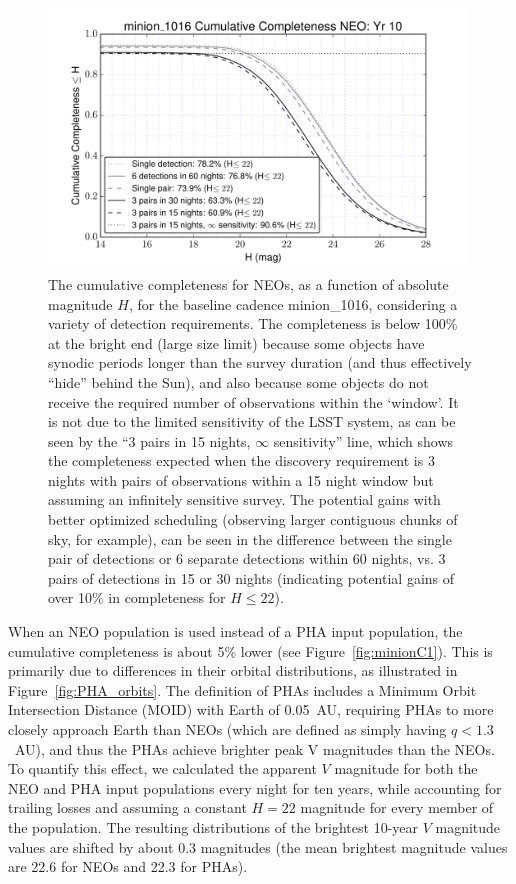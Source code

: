 \begin{figure}[t!]
\centering
\includegraphics[width=0.99\textwidth]{figures/minion_1016_neo_More_Cumulative_Completeness}
\vskip -0.2in
\caption{The cumulative completeness for NEOs, as a function of absolute magnitude $H$, for the baseline
cadence minion\_1016, considering a variety of detection requirements. The completeness is below 100\% at the bright end (large size limit) because some objects have
synodic periods longer than the survey duration (and thus effectively ``hide'' behind the Sun), and also because some objects do not receive the required number of observations within the `window'. It is not due to the limited sensitivity of the LSST system, as can be seen by the ``3 pairs in 15 nights, $\infty$ sensitivity'' line, which shows the completeness expected when the discovery requirement is 3 nights with pairs of observations within a 15 night window but assuming an infinitely sensitive survey. The potential gains with better optimized scheduling (observing larger contiguous chunks of sky, for example), can be seen in the difference between the single pair of detections or 6 separate detections within 60 nights, vs. 3 pairs of detections in 15 or 30 nights (indicating potential gains of over 10\% in completeness for $H\le22$). \label{fig:more_completeness}}
\end{figure}


When an NEO population is used instead of a PHA input population, the cumulative completeness is about 5\% lower
(see Figure~\ref{fig:minionC1}). This is primarily due to differences in their orbital distributions, as illustrated in Figure~\ref{fig:PHA_orbits}. The definition of PHAs includes a Minimum Orbit Intersection Distance (MOID) with Earth of 0.05~AU, requiring PHAs to more closely approach Earth than NEOs (which are defined as simply having $q<1.3$~AU), and thus the PHAs achieve brighter peak V magnitudes than the NEOs. To quantify this effect, we calculated the apparent $V$ magnitude for both the NEO and PHA input populations every night for ten years, while accounting for trailing losses and assuming a constant $H=22$ magnitude for every member of the population. The resulting distributions of the
brightest 10-year $V$ magnitude values are shifted by about 0.3 magnitudes (the mean brightest magnitude values are 22.6 for NEOs and 22.3 for PHAs).


